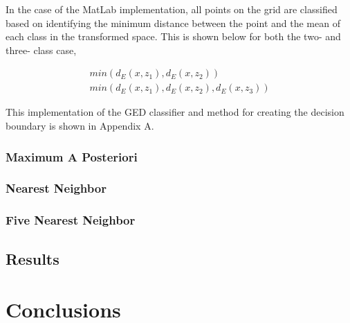 \documentclass[article, 1.5space, letterpaper, 12pt, oneside, header, footer]{SydeClass}
\begin{document}
In the case of the MatLab implementation, all points on the grid are classified based on identifying the minimum distance between the point and the mean of each class in the transformed space. This is shown below for both the two- and three- class case,

\begin{eqnarray}
\label{eqn:pointClass-GED}
min(d_{E} (x,z_{1}), d_{E} (x,z_{2})) \\
min(d_{E} (x,z_{1}), d_{E} (x,z_{2}), d_{E} (x,z_{3}))
\end{eqnarray}


This implementation of the GED classifier and method for creating the decision boundary is shown in Appendix A.

\subsubsection{Maximum A Posteriori}

\subsubsection{Nearest Neighbor}

\subsubsection{Five Nearest Neighbor}

\subsection{Results}



\section{Conclusions}






\end{document}
